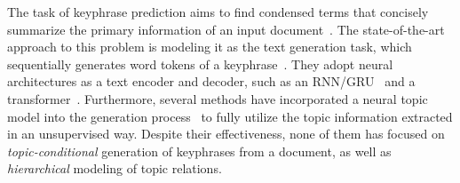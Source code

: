 \label{subsec:kpg}
The task of keyphrase prediction aims to find condensed terms that concisely summarize the primary information of an input document~\cite{liu2020keyphrase}.
The state-of-the-art approach to this problem is modeling it as the text generation task, which sequentially generates word tokens of a keyphrase~\cite{meng2017deep, zhou2021topic}.
They adopt neural architectures as a text encoder and decoder, such as an RNN/GRU~\cite{meng2017deep, wang2019topic} and a transformer~\cite{zhou2021topic}. 
Furthermore, several methods have incorporated a neural topic model into the generation process~\cite{wang2019topic, zhou2021topic} to fully utilize the topic information extracted in an unsupervised way.
Despite their effectiveness, none of them has focused on \textit{topic-conditional} generation of keyphrases from a document, as well as \textit{hierarchical} modeling of topic relations.



